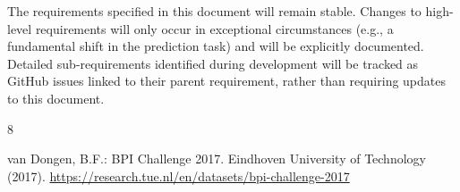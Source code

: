 \documentclass[runningheads]{llncs}
\begin{document}




The requirements specified in this document will remain stable. Changes to high-level requirements will only occur in exceptional circumstances (e.g., a fundamental shift in the prediction task) and will be explicitly documented. Detailed sub-requirements identified during development will be tracked as GitHub issues linked to their parent requirement, rather than requiring updates to this document.

\begin{thebibliography}{8}

    van Dongen, B.F.: BPI Challenge 2017. Eindhoven University of Technology (2017). \url{https://research.tue.nl/en/datasets/bpi-challenge-2017}



\end{thebibliography}
\end{document}
